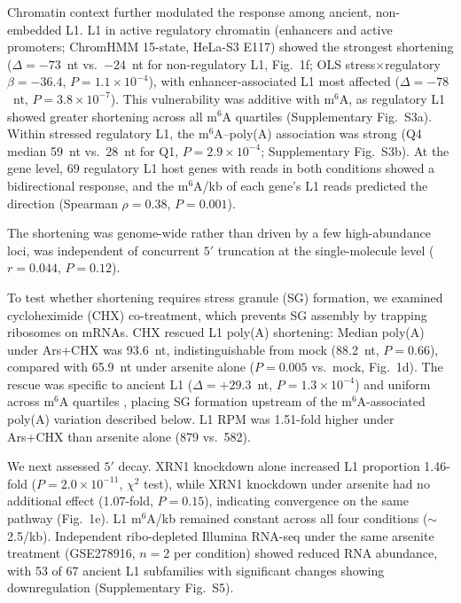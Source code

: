 \documentclass[11pt]{article}
\newcommand{\msix}{m$^6$A}
\begin{document}
Chromatin context further modulated the response among ancient,
non-embedded L1. L1 in active regulatory chromatin (enhancers and active
promoters; ChromHMM 15-state, HeLa-S3 E117) showed the strongest
shortening ($\Delta = -73$~nt vs.\ $-24$~nt for non-regulatory L1,
Fig.~1f; OLS stress$\times$regulatory $\beta = -36.4$,
$P = 1.1 \times 10^{-4}$), with enhancer-associated L1 most affected
($\Delta = -78$~nt, $P = 3.8 \times 10^{-7}$). This vulnerability was
additive with \msix{}, as regulatory L1 showed greater shortening across
all \msix{} quartiles (Supplementary Fig.~S3a). Within stressed
regulatory L1, the \msix{}--poly(A) association was strong (Q4 median
59~nt vs.\ 28~nt for Q1, $P = 2.9 \times 10^{-4}$; Supplementary
Fig.~S3b). At the gene level, 69 regulatory L1 host genes with reads in
both conditions showed a bidirectional response, and the \msix{}/kb of
each gene's L1 reads predicted the direction (Spearman $\rho = 0.38$,
$P = 0.001$).

The shortening was genome-wide rather than driven by a few
high-abundance loci, was independent of
concurrent $5'$ truncation at the single-molecule level ($r = 0.044$,
$P = 0.12$).

To test whether shortening requires stress granule (SG) formation,
we examined cycloheximide (CHX) co-treatment, which prevents SG
assembly by trapping ribosomes on mRNAs. CHX rescued L1 poly(A)
shortening: Median poly(A) under Ars+CHX was
93.6~nt, indistinguishable from mock (88.2~nt, $P = 0.66$), compared
with 65.9~nt under arsenite alone ($P = 0.005$ vs.\ mock, Fig.~1d). The
rescue was specific to ancient L1 ($\Delta = +29.3$~nt,
$P = 1.3 \times 10^{-4}$) and uniform across \msix{} quartiles
, placing SG formation upstream of the
\msix{}-associated poly(A) variation described below. L1 RPM was 1.51-fold
higher under Ars+CHX than arsenite alone (879 vs.\ 582).

We next assessed $5'$ decay. XRN1 knockdown
alone increased L1 proportion 1.46-fold ($P = 2.0 \times 10^{-11}$,
$\chi^2$ test), while XRN1 knockdown under arsenite had no additional
effect (1.07-fold, $P = 0.15$), indicating convergence on the same
pathway (Fig.~1e). L1 \msix{}/kb remained constant across all four
conditions ($\sim$2.5/kb). Independent ribo-depleted Illumina RNA-seq
under the same arsenite treatment (GSE278916, $n = 2$ per condition)
showed reduced RNA abundance, with 53 of 67 ancient L1 subfamilies with
significant changes showing downregulation (Supplementary Fig.~S5).

\end{document}
